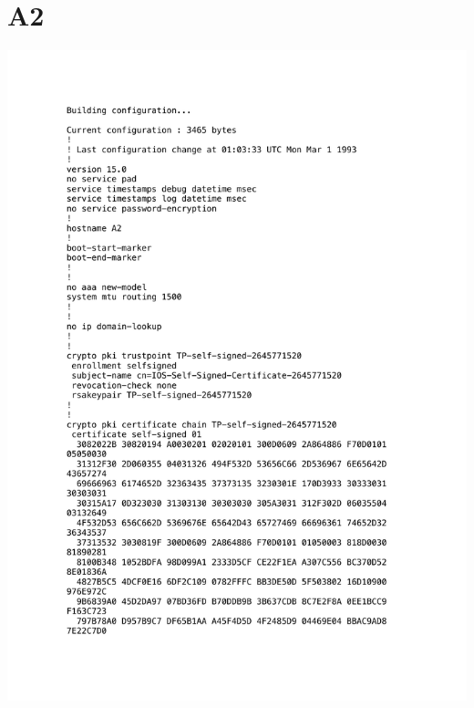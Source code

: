 \documentclass[11pt,a4paper]{scrreprt}
\begin{document}
\section{A2}
\vspace{-1cm}
\includegraphics[height=\dimexpr\textheight-4\baselineskip\relax,page=1]{../config_files/A2.pdf}

\end{document}
